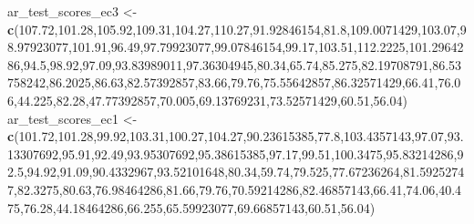 \documentclass[
]{book}
\newenvironment{Shaded}{\begin{snugshade}}{\end{snugshade}}
\newcommand{\FloatTok}[1]{\textcolor[rgb]{0.00,0.00,0.81}{#1}}
\newcommand{\KeywordTok}[1]{\textcolor[rgb]{0.13,0.29,0.53}{\textbf{#1}}}
\newcommand{\NormalTok}[1]{#1}
\newcommand{\StringTok}[1]{\textcolor[rgb]{0.31,0.60,0.02}{#1}}
\begin{document}
\begin{Shaded}
\begin{Highlighting}[]
\NormalTok{ar_test_scores_ec3 <-}\StringTok{ }\KeywordTok{c}\NormalTok{(}\FloatTok{107.72}\NormalTok{,}\FloatTok{101.28}\NormalTok{,}\FloatTok{105.92}\NormalTok{,}\FloatTok{109.31}\NormalTok{,}\FloatTok{104.27}\NormalTok{,}\FloatTok{110.27}\NormalTok{,}\FloatTok{91.92846154}\NormalTok{,}\FloatTok{81.8}\NormalTok{,}\FloatTok{109.0071429}\NormalTok{,}\FloatTok{103.07}\NormalTok{,}\FloatTok{98.97923077}\NormalTok{,}\FloatTok{101.91}\NormalTok{,}\FloatTok{96.49}\NormalTok{,}\FloatTok{97.79923077}\NormalTok{,}\FloatTok{99.07846154}\NormalTok{,}\FloatTok{99.17}\NormalTok{,}\FloatTok{103.51}\NormalTok{,}\FloatTok{112.2225}\NormalTok{,}\FloatTok{101.2964286}\NormalTok{,}\FloatTok{94.5}\NormalTok{,}\FloatTok{98.92}\NormalTok{,}\FloatTok{97.09}\NormalTok{,}\FloatTok{93.83989011}\NormalTok{,}\FloatTok{97.36304945}\NormalTok{,}\FloatTok{80.34}\NormalTok{,}\FloatTok{65.74}\NormalTok{,}\FloatTok{85.275}\NormalTok{,}\FloatTok{82.19708791}\NormalTok{,}\FloatTok{86.53758242}\NormalTok{,}\FloatTok{86.2025}\NormalTok{,}\FloatTok{86.63}\NormalTok{,}\FloatTok{82.57392857}\NormalTok{,}\FloatTok{83.66}\NormalTok{,}\FloatTok{79.76}\NormalTok{,}\FloatTok{75.55642857}\NormalTok{,}\FloatTok{86.32571429}\NormalTok{,}\FloatTok{66.41}\NormalTok{,}\FloatTok{76.06}\NormalTok{,}\FloatTok{44.225}\NormalTok{,}\FloatTok{82.28}\NormalTok{,}\FloatTok{47.77392857}\NormalTok{,}\FloatTok{70.005}\NormalTok{,}\FloatTok{69.13769231}\NormalTok{,}\FloatTok{73.52571429}\NormalTok{,}\FloatTok{60.51}\NormalTok{,}\FloatTok{56.04}\NormalTok{)}
\NormalTok{ar_test_scores_ec1 <-}\StringTok{ }\KeywordTok{c}\NormalTok{(}\FloatTok{101.72}\NormalTok{,}\FloatTok{101.28}\NormalTok{,}\FloatTok{99.92}\NormalTok{,}\FloatTok{103.31}\NormalTok{,}\FloatTok{100.27}\NormalTok{,}\FloatTok{104.27}\NormalTok{,}\FloatTok{90.23615385}\NormalTok{,}\FloatTok{77.8}\NormalTok{,}\FloatTok{103.4357143}\NormalTok{,}\FloatTok{97.07}\NormalTok{,}\FloatTok{93.13307692}\NormalTok{,}\FloatTok{95.91}\NormalTok{,}\FloatTok{92.49}\NormalTok{,}\FloatTok{93.95307692}\NormalTok{,}\FloatTok{95.38615385}\NormalTok{,}\FloatTok{97.17}\NormalTok{,}\FloatTok{99.51}\NormalTok{,}\FloatTok{100.3475}\NormalTok{,}\FloatTok{95.83214286}\NormalTok{,}\FloatTok{92.5}\NormalTok{,}\FloatTok{94.92}\NormalTok{,}\FloatTok{91.09}\NormalTok{,}\FloatTok{90.4332967}\NormalTok{,}\FloatTok{93.52101648}\NormalTok{,}\FloatTok{80.34}\NormalTok{,}\FloatTok{59.74}\NormalTok{,}\FloatTok{79.525}\NormalTok{,}\FloatTok{77.67236264}\NormalTok{,}\FloatTok{81.59252747}\NormalTok{,}\FloatTok{82.3275}\NormalTok{,}\FloatTok{80.63}\NormalTok{,}\FloatTok{76.98464286}\NormalTok{,}\FloatTok{81.66}\NormalTok{,}\FloatTok{79.76}\NormalTok{,}\FloatTok{70.59214286}\NormalTok{,}\FloatTok{82.46857143}\NormalTok{,}\FloatTok{66.41}\NormalTok{,}\FloatTok{74.06}\NormalTok{,}\FloatTok{40.475}\NormalTok{,}\FloatTok{76.28}\NormalTok{,}\FloatTok{44.18464286}\NormalTok{,}\FloatTok{66.255}\NormalTok{,}\FloatTok{65.59923077}\NormalTok{,}\FloatTok{69.66857143}\NormalTok{,}\FloatTok{60.51}\NormalTok{,}\FloatTok{56.04}\NormalTok{)}

\end{Highlighting}
\end{Shaded}
\end{document}
